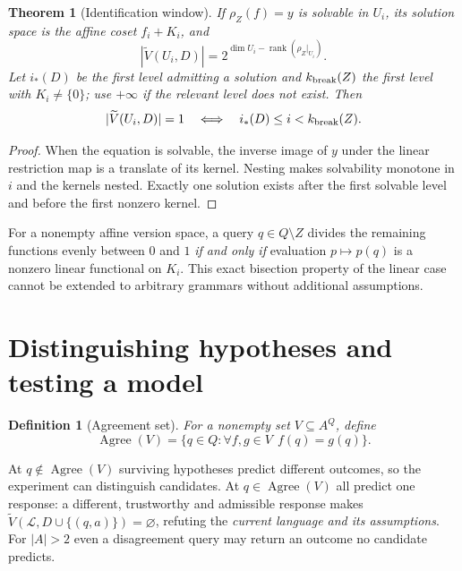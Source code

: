 \documentclass[11pt,a4paper]{article}
\newtheorem{definition}{Definition}[section]
\newtheorem{theorem}{Theorem}[section]
\newcommand{\VS}{\widetilde V}
\newcommand{\Agree}{\operatorname{Agree}}
\begin{document}
\begin{theorem}[Identification window]\label{thm:window}
If $\rho_Z(f)=y$ is solvable in $U_i$, its solution space is the affine coset $f_i+K_i$, and
\begin{equation}\label{eq:affine}
|\VS(U_i,D)|=2^{\dim U_i-\operatorname{rank}(\rho_Z|_{U_i})}.
\end{equation}
Let $i_*(D)$ be the first level admitting a solution and $k_{\rm break}(Z)$ the first level with $K_i\ne\{0\}$; use $+\infty$ if the relevant level does not exist. Then
\begin{equation}\label{eq:window}
|\VS(U_i,D)|=1\quad\Longleftrightarrow\quad i_*(D)\le i<k_{\rm break}(Z).
\end{equation}
\end{theorem}
\begin{proof}
When the equation is solvable, the inverse image of $y$ under the linear restriction map is a translate of its kernel. Nesting makes solvability monotone in $i$ and the kernels nested. Exactly one solution exists after the first solvable level and before the first nonzero kernel.
\end{proof}

For a nonempty affine version space, a query $q\in Q\setminus Z$ divides the remaining functions evenly between $0$ and $1$ \emph{if and only if} evaluation $p\mapsto p(q)$ is a nonzero linear functional on $K_i$. This exact bisection property of the linear case cannot be extended to arbitrary grammars without additional assumptions.

\section{Distinguishing hypotheses and testing a model}

\begin{definition}[Agreement set]
For a \emph{nonempty} set $V\subseteq A^Q$, define
\begin{equation}\label{eq:agree}
\Agree(V)=\{q\in Q:\forall f,g\in V\ \ f(q)=g(q)\}.
\end{equation}
\end{definition}

At $q\notin\Agree(V)$ surviving hypotheses predict different outcomes, so the experiment can distinguish candidates. At $q\in\Agree(V)$ all predict one response: a different, trustworthy and admissible response makes $\VS(\mathcal L,D\cup\{(q,a)\})=\varnothing$, refuting the \emph{current language and its assumptions}. For $|A|>2$ even a disagreement query may return an outcome no candidate predicts.
\end{document}
